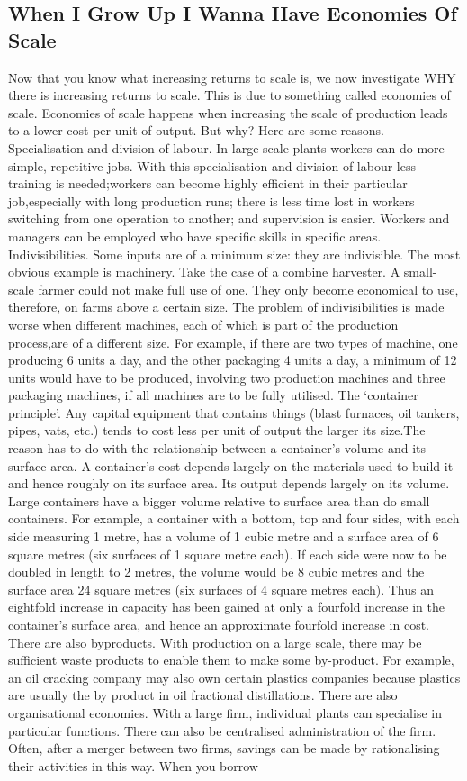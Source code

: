 \subsection{When I Grow Up I Wanna Have Economies Of Scale}
Now that you know what increasing returns to scale is, we now investigate WHY there is increasing returns to scale. This is due to something called economies of scale. Economies of scale happens when increasing the scale of production leads to a lower cost per unit of output. But why? Here are some reasons. Specialisation and division of labour. In large-scale plants workers can do more simple, repetitive jobs. With this specialisation and division of labour less training is needed;workers can become highly efficient in their particular job,especially with long production runs; there is less time lost in workers switching from one operation to another; and supervision is easier. Workers and managers can be employed who have specific skills in specific areas. Indivisibilities. Some inputs are of a minimum size: they are indivisible. The most obvious example is machinery. Take the case of a combine harvester. A small-scale farmer could not make full use of one. They only become economical to use, therefore, on farms above a certain size. The problem of indivisibilities is made worse when different machines, each of which is part of the production process,are of a different size. For example, if there are two types of machine, one producing 6 units a day, and the other packaging 4 units a day, a minimum of 12 units would have to be produced, involving two production machines and three packaging machines, if all machines are to be fully utilised. The ‘container principle'. Any capital equipment that contains things (blast furnaces, oil tankers, pipes, vats, etc.) tends to cost less per unit of output the larger its size.The reason has to do with the relationship between a container's volume and its surface area. A container's cost depends largely on the materials used to build it and hence roughly on its surface area. Its output depends largely on its volume. Large containers have a bigger volume relative to surface area than do small containers. For example, a container with a bottom, top and four sides, with each side measuring 1 metre, has a volume of 1 cubic metre and a surface area of 6 square metres (six surfaces of 1 square metre each). If each side were now to be doubled in length to 2 metres, the volume would be 8 cubic metres and the surface area 24 square metres (six surfaces of 4 square metres each). Thus an eightfold increase in capacity has been gained at only a fourfold increase in the container's surface area, and hence an approximate fourfold increase in cost. There are also byproducts. With production on a large scale, there may be sufficient waste products to enable them to make some by-product. For example, an oil cracking company may also own certain plastics companies because plastics are usually the by product in oil fractional distillations. There are also organisational economies. With a large firm, individual plants can specialise in particular functions. There can also be centralised administration of the firm. Often, after a merger between two firms, savings can be made by rationalising their activities in this way. When you borrow 